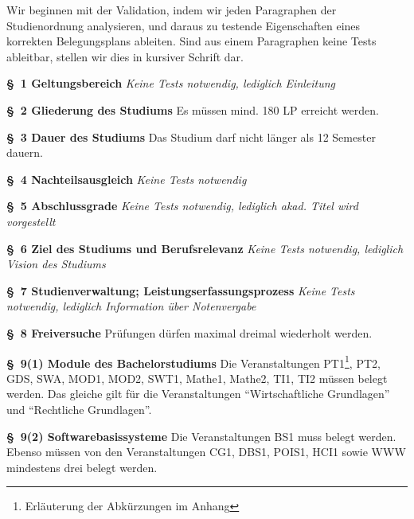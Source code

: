 \documentclass[ngerman]{article}
\begin{document}
Wir beginnen mit der Validation, indem wir jeden Paragraphen der Studienordnung analysieren, und daraus zu testende Eigenschaften eines korrekten Belegungsplans ableiten.
Sind aus einem Paragraphen keine Tests ableitbar, stellen wir dies in kursiver Schrift dar.

\setlength{\parindent}{0cm}

\begin{paracol}{2}
\textbf{§~1 Geltungsbereich}
\switchcolumn
\emph{Keine Tests notwendig, lediglich Einleitung}
\\
\switchcolumn*

\textbf{§~2 Gliederung des Studiums}
\switchcolumn
Es müssen mind. 180 LP erreicht werden.
\\
\switchcolumn*

\textbf{§~3 Dauer des Studiums}
\switchcolumn
Das Studium darf nicht länger als 12 Semester dauern.
\\
\switchcolumn*

\textbf{§~4 Nachteilsausgleich}
\switchcolumn
\emph{Keine Tests notwendig}
\\
\switchcolumn*

\textbf{§~5 Abschlussgrade}
\switchcolumn
\emph{Keine Tests notwendig, lediglich akad. Titel wird vorgestellt}
\\
\switchcolumn*

\textbf{§~6 Ziel des Studiums und Berufsrelevanz}
\switchcolumn
\emph{Keine Tests notwendig, lediglich Vision des Studiums}
\\
\switchcolumn*

\textbf{§~7 Studienverwaltung; Leistungserfassungsprozess}
\switchcolumn
\emph{Keine Tests notwendig, lediglich Information über Notenvergabe}
\\
\switchcolumn*

\textbf{§~8 Freiversuche}
\switchcolumn
Prüfungen dürfen maximal dreimal wiederholt werden.
\\
\switchcolumn* 

\textbf{§~9(1) Module des Bachelorstudiums}
\switchcolumn
Die Veranstaltungen PT1\footnote{Erläuterung der Abkürzungen im Anhang}, PT2, GDS, SWA, MOD1, MOD2, SWT1, Mathe1, Mathe2, TI1, TI2 müssen belegt werden.
Das gleiche gilt für die Veranstaltungen ``Wirtschaftliche Grundlagen'' und ``Rechtliche Grundlagen''.
\\
\switchcolumn*

\textbf{§~9(2) Softwarebasissysteme}
\switchcolumn
Die Veranstaltungen BS1 muss belegt werden.
Ebenso müssen von den Veranstaltungen CG1, DBS1, POIS1, HCI1 sowie WWW mindestens drei belegt werden.
\\
\switchcolumn*


\end{paracol}
\end{document}
